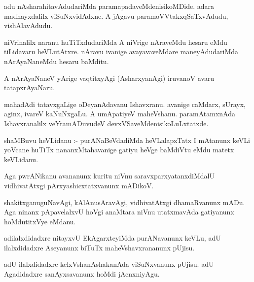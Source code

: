 \documentclass{article}
\begin{document}
\begin{mn}
adu  nAsharahitavAdudariMda  paramapadaveMdenisikoMDide.  adara  madhayxdalilx  viSuNxvidAdxne.  A  jAgavu  
paramoVVtakxqSaTxvAdudu,  vishAlavAdudu.
\end{mn}

\begin{mn}
niVrinalilx  naranu  huTiTxdudariMda  A  niVrige  nAraveMdu  hesaru  eMdu  tiLidavaru  heVLutAtxre.  nAravu  
ivanige  avayavaveMdare  maneyAdudariMda  nArAyaNaneMdu  hesaru  baMditu.
\end{mn}

\begin{mn}
A  nArAyaNaneV  yArige  vaqtitxyAgi (AsharxyanAgi) iruvanoV  avaru  tatapxrAyaNaru.
\end{mn}

\begin{mn}
mahadAdi  tatavxgaLige  oDeyanAdavanu  Ishavxranu.  avanige  caMdarx,  sUrayx,  aginx,  ivareV  kaNuNxgaLu.  
A  umApatiyeV  maheVshanu.  paramAtamxnAda  Ishavxranalilx  veYramADuvudeV  devxVSaveMdenisikoLuLxtatxde.
\end{mn}

\begin{mn}
shaMBuvu  heVLidanu :- purANaBeVdadiMda  heVLalapxTatx  I  mAtanunx  keVLi  yoVcane  huTiTx  nananxMtahavanige  
gatiyu  heVge  baMdiVtu  eMdu  matetx  keVLidanu.
\end{mn}

\begin{mn}
Aga  pwrANikanu  avananunx  kuritu  niVnu  saravxparxyatanxdiMdalU  vidhivatAtxgi  pArxyashicxtatxvanunx  mADikoV.
\end{mn}

\begin{mn}
shakitxganuguNavAgi,  kAlAnusAravAgi,  vidhivatAtxgi  dhamaRvanunx mADu.  Aga  ninanx  pApavelalxvU  hoVgi  
anaMtara  niVnu  utatxmavAda  gatiyanunx  hoMdutitxVye  eMdanu.
\end{mn}

\begin{mn}
adilalxdidadxre  nitayxvU  EkAgarxteyiMda  purANavanunx  keVLu,  adU  ilalxdidadxre  Aseyanunx  biTuTx  maheVshavxrananunx  pUjisu.
\end{mn}

\begin{mn}
adU  ilalxdidadxre  kelxVshanAshakanAda  viSuNxvanunx  pUjisu.  adU  Agadidadxre  sanAyxsavanunx  hoMdi  jAcnxniyAgu.
\end{mn}
\end{document}
